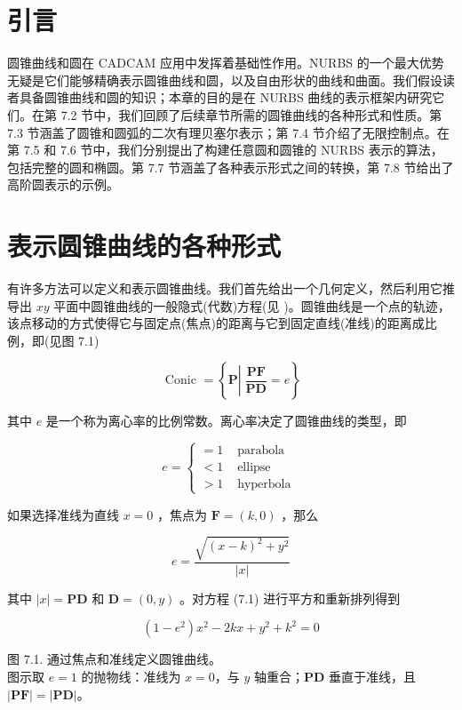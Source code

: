 \documentclass[../main.tex]{subfiles}
\begin{document}
\section{引言}

圆锥曲线和圆在 CADCAM 应用中发挥着基础性作用。NURBS 的一个最大优势无疑是它们能够精确表示圆锥曲线和圆，以及自由形状的曲线和曲面。我们假设读者具备圆锥曲线和圆的知识；本章的目的是在 NURBS 曲线的表示框架内研究它们。在第 7.2 节中，我们回顾了后续章节所需的圆锥曲线的各种形式和性质。第 7.3 节涵盖了圆锥和圆弧的二次有理贝塞尔表示；第 7.4 节介绍了无限控制点。在第 7.5 和 7.6 节中，我们分别提出了构建任意圆和圆锥的 NURBS 表示的算法，包括完整的圆和椭圆。第 7.7 节涵盖了各种表示形式之间的转换，第 7.8 节给出了高阶圆表示的示例。



\section{表示圆锥曲线的各种形式}

有许多方法可以定义和表示圆锥曲线。我们首先给出一个几何定义，然后利用它推导出 \({xy}\) 平面中圆锥曲线的一般隐式(代数)方程(见 \cite{Lawr72})。圆锥曲线是一个点的轨迹，该点移动的方式使得它与固定点(焦点)的距离与它到固定直线(准线)的距离成比例，即(见图 7.1)

\[
\text{ Conic } = \left\{  {\mathbf{P}\left| {\;\frac{\mathbf{{PF}}}{\mathbf{{PD}}} = e}\right. }\right\}
\]

其中 \(e\) 是一个称为离心率的比例常数。离心率决定了圆锥曲线的类型，即

\[
e = \left\{  \begin{array}{ll}  = 1 & \text{ parabola } \\   < 1 & \text{ ellipse } \\   > 1 & \text{ hyperbola } \end{array}\right.
\]

如果选择准线为直线 \(x = 0\) ，焦点为 \(\mathbf{F} = \left( {k,0}\right)\) ，那么

\[
e = \frac{\sqrt{{\left( x - k\right) }^{2} + {y}^{2}}}{\left| x\right| } \tag{7.1}
\]

其中 \(\left| x\right|  = \mathbf{{PD}}\) 和 \(\mathbf{D} = \left( {0,y}\right)\) 。对方程 (7.1) 进行平方和重新排列得到

\[
\left( {1 - {e}^{2}}\right) {x}^{2} - {2kx} + {y}^{2} + {k}^{2} = 0 \tag{7.2}
\]

\begin{center}
\begin{minipage}{14cm}
\vspace*{.6\baselineskip}
\centering
{}
\par\smallskip
图 7.1. 通过焦点和准线定义圆锥曲线。\\
图示取 $e=1$ 的抛物线：准线为 $x=0$，与 $y$ 轴重合；$\mathbf{PD}$ 垂直于准线，且 $|\mathbf{PF}|=|\mathbf{PD}|$。
\end{minipage}
\end{center}
\end{document}
